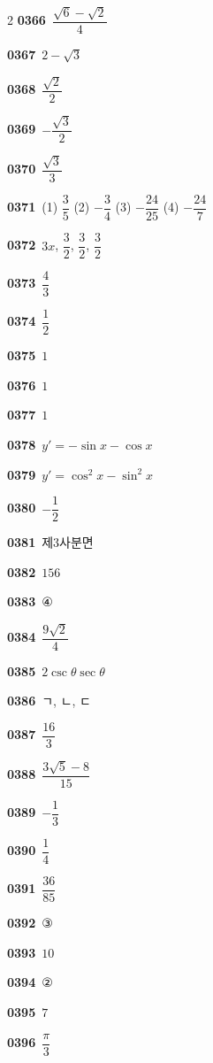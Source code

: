 \documentclass[10pt,a4paper]{article}
\begin{document}
\begin{multicols}{2}
\noindent\textbf{0366}\ $\dfrac{\sqrt{6}-\sqrt{2}}{4}$\par
\noindent\textbf{0367}\ $2-\sqrt{3}$\par
\noindent\textbf{0368}\ $\dfrac{\sqrt{2}}{2}$\par
\noindent\textbf{0369}\ $-\dfrac{\sqrt{3}}{2}$\par
\noindent\textbf{0370}\ $\dfrac{\sqrt{3}}{3}$\par
\noindent\textbf{0371}\ (1) $\dfrac{3}{5}$ \quad (2) $-\dfrac{3}{4}$ \quad (3) $-\dfrac{24}{25}$ \quad (4) $-\dfrac{24}{7}$\par
\noindent\textbf{0372}\ $3x$, $\dfrac{3}{2}$, $\dfrac{3}{2}$, $\dfrac{3}{2}$\par
\noindent\textbf{0373}\ $\dfrac{4}{3}$\par
\noindent\textbf{0374}\ $\dfrac{1}{2}$\par
\noindent\textbf{0375}\ $1$\par
\noindent\textbf{0376}\ $1$\par
\noindent\textbf{0377}\ $1$\par
\noindent\textbf{0378}\ $y'=-\sin x-\cos x$\par
\noindent\textbf{0379}\ $y'=\cos^2 x-\sin^2 x$\par
\noindent\textbf{0380}\ $-\dfrac{1}{2}$\par
\noindent\textbf{0381}\ 제$3$사분면\par
\noindent\textbf{0382}\ $156$\par
\noindent\textbf{0383}\ ④\par
\noindent\textbf{0384}\ $\dfrac{9\sqrt{2}}{4}$\par
\noindent\textbf{0385}\ $2\csc\theta\sec\theta$\par
\noindent\textbf{0386}\ ㄱ, ㄴ, ㄷ\par
\noindent\textbf{0387}\ $\dfrac{16}{3}$\par
\noindent\textbf{0388}\ $\dfrac{3\sqrt{5}-8}{15}$\par
\noindent\textbf{0389}\ $-\dfrac{1}{3}$\par
\noindent\textbf{0390}\ $\dfrac{1}{4}$\par
\noindent\textbf{0391}\ $\dfrac{36}{85}$\par
\noindent\textbf{0392}\ ③\par
\noindent\textbf{0393}\ $10$\par
\noindent\textbf{0394}\ ②\par
\noindent\textbf{0395}\ $7$\par
\noindent\textbf{0396}\ $\dfrac{\pi}{3}$\par

\end{multicols}
\end{document}
